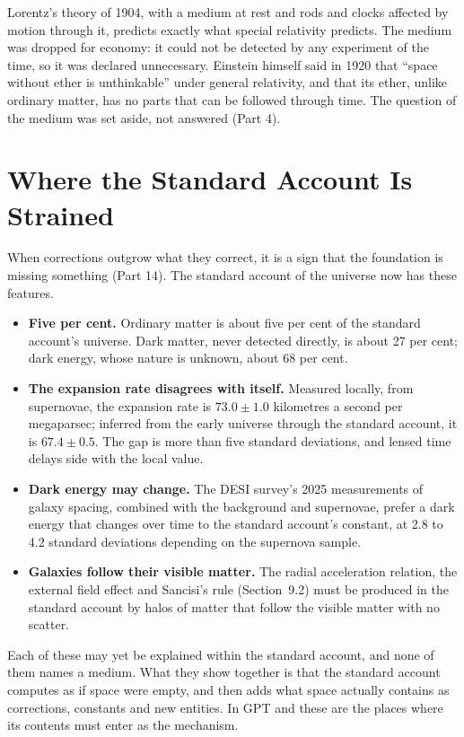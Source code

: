  Lorentz's theory of 1904, with a medium at rest and rods and clocks affected by motion through it, predicts exactly what special relativity predicts. The medium was dropped for economy: it could not be detected by any experiment of the time, so it was declared unnecessary. Einstein himself said in 1920 that ``space without ether is unthinkable'' under general relativity, and that its ether, unlike ordinary matter, has no parts that can be followed through time. The question of the medium was set aside, not answered (Part 4).

\section{Where the Standard Account Is Strained}

When corrections outgrow what they correct, it is a sign that the foundation is missing something (Part 14). The standard account of the universe now has these features.
\begin{itemize}
\item \textbf{Five per cent.} Ordinary matter is about five per cent of the standard account's universe. Dark matter, never detected directly, is about 27 per cent; dark energy, whose nature is unknown, about 68 per cent.
\item \textbf{The expansion rate disagrees with itself.} Measured locally, from supernovae, the expansion rate is $73.0\pm1.0$ kilometres a second per megaparsec; inferred from the early universe through the standard account, it is $67.4\pm0.5$. The gap is more than five standard deviations, and lensed time delays side with the local value.
\item \textbf{Dark energy may change.} The DESI survey's 2025 measurements of galaxy spacing, combined with the background and supernovae, prefer a dark energy that changes over time to the standard account's constant, at 2.8 to 4.2 standard deviations depending on the supernova sample.
\item \textbf{Galaxies follow their visible matter.} The radial acceleration relation, the external field effect and Sancisi's rule (Section~9.2) must be produced in the standard account by halos of matter that follow the visible matter with no scatter.
\end{itemize}

 Each of these may yet be explained within the standard account, and none of them names a medium. What they show together is that the standard account computes as if space were empty, and then adds what space actually contains as corrections, constants and new entities. In GPT  and these are the places where its contents must enter as the mechanism.

